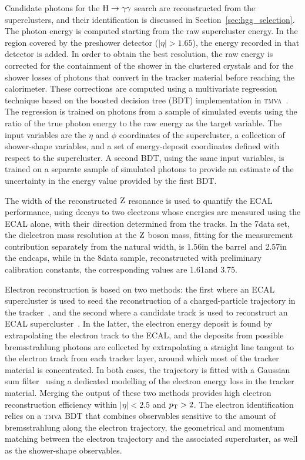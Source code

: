 \documentclass[12pt,twoside,a4paper,cmspaper,final,collab]{cms-tdr}
\begin{document}
Candidate photons for the $\mathrm{H}\to\gamma\gamma$ search are reconstructed from the superclusters, and their identification is discussed in Section~\ref{sec:hgg_selection}.
The photon energy is computed starting from the raw supercluster energy.
In the region covered by the preshower detector ($|\eta| > 1.65$),
the energy recorded in that detector is added.
In order to obtain the best resolution, the raw energy is corrected
for the containment of the shower in the clustered crystals
and for the shower losses of photons that convert in
the tracker material before reaching the calorimeter.
These corrections are computed
using a multivariate regression technique based on the boosted
decision tree (BDT) implementation in \textsc{tmva}~\cite{Hocker:2007ht}.
The regression is trained on photons from a sample of simulated events using the ratio of
the true photon energy to the raw energy as the target variable.
The input variables are the $\eta$ and $\phi$ coordinates of the supercluster, a collection of
shower-shape variables, and a set of energy-deposit coordinates defined with respect to the supercluster.
A second BDT, using the same input variables, is trained on a separate sample of simulated photons to provide an
estimate of the uncertainty in the energy value provided by
the first BDT.

The width of the reconstructed $\mathrm{Z}$ resonance is used to quantify the
ECAL performance, using decays to two electrons whose energies are
measured using the ECAL alone, with their direction determined from the
tracks. In the 7\TeV data set, the dielectron mass resolution at the $\mathrm{Z}$
boson mass, fitting for the measurement contribution separately from the
natural width, is 1.56\GeV in the barrel and 2.57\GeV in the endcaps,
while in the 8\TeV data sample, reconstructed with preliminary calibration
constants, the corresponding values are 1.61\GeV and 3.75\GeV.


Electron reconstruction is based on two methods: the first where an ECAL
supercluster is used to seed the reconstruction of a
charged-particle trajectory in the tracker~\cite{Baffioni:2006cd,CMS-PAS-EGM-10-004},
and the second where a candidate track is used to reconstruct an ECAL supercluster~\cite{CMS-PAS-PFT-10-003}.
In the latter, the electron energy deposit is found by extrapolating the electron track to the ECAL,
and the deposits from possible bremsstrahlung photons are collected by extrapolating a straight line tangent to the electron track
from each tracker layer, around which most of the tracker material is concentrated.
In both cases, the trajectory is fitted with a Gaussian sum filter~\cite{Adam2005} using a dedicated modelling of the electron energy loss in the tracker material.
Merging the output of these two methods provides high electron reconstruction efficiency within $|\eta| < 2.5$ and $p_{\mathrm{T}}>2$\GeV.
The electron identification relies on a \textsc{tmva} BDT that combines observables sensitive to the
amount of bremsstrahlung along the electron trajectory, the geometrical and momentum matching between the electron trajectory and the associated supercluster, as well as  the shower-shape observables.
\end{document}
